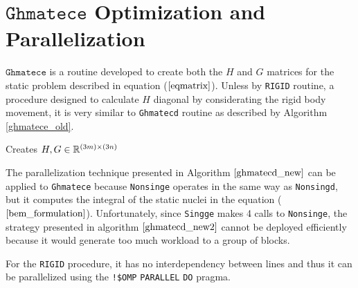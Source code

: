 \section{$\texttt{Ghmatece}$ Optimization and Parallelization}

$\texttt{Ghmatece}$ is a routine developed to create both the $H$ and $G$ matrices for the static problem described in equation ($\ref{eqmatrix}$). 
Unless by \texttt{RIGID} routine, a procedure designed to calculate $H$ diagonal by considerating the rigid body movement, 
it is very similar to \texttt{Ghmatecd} routine as described by Algorithm \ref{ghmatece_old}. 

\begin{algorithm}[H]
\caption{Creates $H, G \in \mathbb{R}^{(3m)\times(3n)}$}
\label{ghmatece_old}
\begin{algorithmic}[1]
				\Else
				\EndIf
			\EndFor
		\EndFor 
	\EndProcedure

				\EndIf
			\EndFor
		\EndFor
		\EndProcedure
\end{algorithmic}
\end{algorithm}

The parallelization technique presented in Algorithm $\ref{ghmatecd_new}$ can be applied to \texttt{Ghmatece} 
because \texttt{Nonsinge} operates in the same way as \texttt{Nonsingd}, but it computes the integral 
of the static nuclei in the equation ($\ref{bem_formulation}$). Unfortunately, since 
\texttt{Singge} makes 4 calls to \texttt{Nonsinge}, the strategy presented in 
algorithm $\ref{ghmatecd_new2}$ cannot be deployed efficiently because it would 
generate too much workload to a group of blocks.

For the \texttt{RIGID} procedure, it has no interdependency between lines and thus it can be parallelized using the 
\texttt{!\$OMP} \texttt{PARALLEL} \texttt{DO} pragma.

